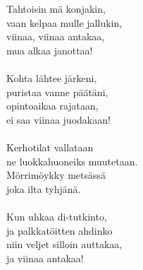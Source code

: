 
Tahtoisin mä konjakin, \\ vaan kelpaa mulle jallukin, \\ viinaa, viinaa antakaa, \\ mua alkaa janottaa! \\ \hspace{10mm} \\ Kohta lähtee järkeni, \\ puristaa vanne päätäni, \\ opintoaikaa rajataan, \\ ei saa viinaa juodakaan! \\ \hspace{10mm} \\ Kerhotilat vallataan \\ ne luokkahuoneiks muutetaan. \\ Mörrimöykky metsässä \\ joka ilta tyhjänä. \\ \hspace{10mm} \\ Kun uhkaa di-tutkinto, \\ ja palkkatöitten ahdinko \\ niin veljet silloin auttakaa, \\ ja viinaa antakaa!